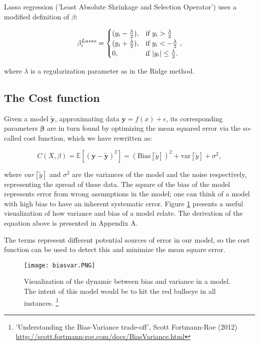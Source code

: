 \documentclass[reprint,english,notitlepage]{revtex4-1}  %
\begin{document}
Lasso regression ('Least Absolute Shrinkage and Selection Operator') uses a modified definition of $\beta$:

$$\beta^{Lasso}_i = \begin{cases}
    (y_i - \frac{\lambda}{2}), & \text{if  } y_i > \frac{\lambda}{2}\\
    (y_i + \frac{\lambda}{2}), & \text{if  } y_i < -\frac{\lambda}{2}\\ 
    0, & \text{if  } \abs{y_i} \leq \frac{\lambda}{2}.
\end{cases},$$

where $\lambda$ is a regularization parameter as in the Ridge method.

\subsection{The Cost function}

Given a model $\tilde{\bm{y}}$, approximating data $\bm{y} = f(x) + \epsilon$, its corresponding parameters $\bm{\beta}$ are in turn found by optimizing the mean squared error via the so-called cost function, which we have rewritten as:

\[
C(X,\beta) = \mathbb{E}\left[(\bm{y}-\bm{\tilde{y}})^2\right]=(\mathrm{Bias}[\tilde{y}])^2+\mathrm{var}[\tilde{y}]+\sigma^2, 
\]

where $var[\tilde{y}]$ and $\sigma^2$ are the variances of the model and the noise respectively, representing the spread of these data. The square of the bias of the model represents error from wrong assumptions in the model; one can think of a model with high bias to have an inherent systematic error. Figure \ref{fig:bv1} presents a useful visualization of how variance and bias of a model relate. The derivation of the equation above is presented in Appendix A.

The terms represent different potential sources of error in our model, so the cost function can be used to detect this and minimize the mean square error.

\begin{figure}[h!]
    \centering
    \texttt{[image: biasvar.PNG]}
    \caption{Visualization of the dynamic between bias and variance in a model. The intent of this model would be to hit the red bullseye in all instances. \footnote{'Understanding the Bias-Variance trade-off', Scott Fortmann-Roe (2012) \url{http://scott.fortmann-roe.com/docs/BiasVariance.html}}}
    \label{fig:bv1}
\end{figure}
\end{document}
